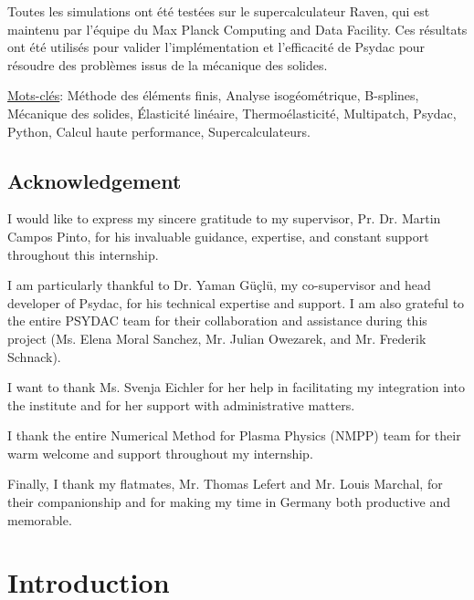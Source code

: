 \documentclass[a4paper,12pt,twoside]{report}
\begin{document}
Toutes les simulations ont été testées sur le supercalculateur Raven, qui est maintenu par l'équipe du Max Planck Computing and Data Facility. Ces résultats ont été utilisés pour valider l'implémentation et l'efficacité de Psydac pour résoudre des problèmes issus de la mécanique des solides.

\vspace{0.4cm}

\underline{Mots-clés}: Méthode des éléments finis, Analyse isogéométrique, B-splines, Mécanique des solides, Élasticité linéaire, Thermoélasticité, Multipatch, Psydac, Python, Calcul haute performance, Supercalculateurs.

\newpage\null

\newpage

\section*{Acknowledgement}

I would like to express my sincere gratitude to my supervisor, Pr. Dr. Martin Campos Pinto, for his invaluable guidance, expertise, and constant support throughout this internship.

I am particularly thankful to Dr. Yaman Güçlü, my co-supervisor and head developer of Psydac, for his technical expertise and support. I am also grateful to the entire PSYDAC team for their collaboration and assistance during this project (Ms. Elena Moral Sanchez, Mr. Julian Owezarek, and Mr. Frederik Schnack).

I want to thank Ms. Svenja Eichler for her help in facilitating my integration into the institute and for her support with administrative matters.

I thank the entire Numerical Method for Plasma Physics (NMPP) team for their warm welcome and support throughout my internship.

Finally, I thank my flatmates, Mr. Thomas Lefert and Mr. Louis Marchal, for their companionship and for making my time in Germany both productive and memorable.

\newpage
\tableofcontents
\thispagestyle{test}

\newpage
\listoffigures
{}


\newpage
\chapter{Introduction}
\end{document}
